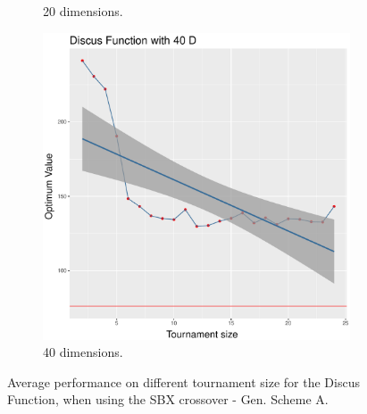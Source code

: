 \begin{figure}[t]
\begin{subfigure}[b]{0.33\textwidth}
		\caption{20 dimensions.}
	\end{subfigure}
	\begin{subfigure}[b]{0.33\textwidth}
		\centering
		\includegraphics[width=\textwidth]{img/unimodal_sbx_11_dim_40.pdf}
		\caption{40 dimensions.}
	\end{subfigure}
	\caption{Average performance on different tournament size for the Discus Function, when using the SBX crossover - Gen. Scheme A.}
	\label{sbx-11}
\end{figure}


